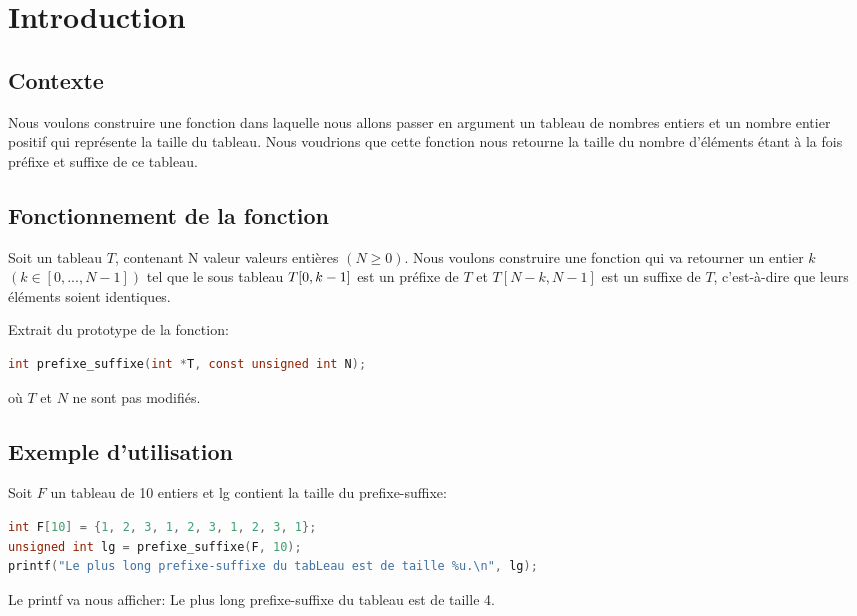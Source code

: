 \section{Introduction}\label{introduction}
\subsection{Contexte}
Nous voulons construire une fonction dans laquelle nous allons passer en argument
un tableau de nombres entiers et un nombre entier positif qui représente la taille du tableau.
Nous voudrions que cette fonction nous retourne la taille du nombre d'éléments
étant à la fois préfixe et suffixe de ce tableau.

\subsection{Fonctionnement de la fonction}
Soit un tableau $T$, contenant N valeur valeurs entières $(N \geq 0)$. Nous 
voulons construire une fonction qui va retourner un entier $k$ $(k \in [0, ...,
 N-1])$ tel que le sous tableau $T[0,\space k-1]$ est un préfixe de $T$ et 
$T[N-k, N-1]$ est un suffixe de $T$, c'est-à-dire que leurs éléments soient
identiques.

Extrait du prototype de la fonction:
\begin{lstlisting}[language=C, caption=Fonction souhaitée]
int prefixe_suffixe(int *T, const unsigned int N);
\end{lstlisting}
où $T$ et $N$ ne sont pas modifiés.

\subsection{Exemple d'utilisation}
Soit $F$ un tableau de 10 entiers et lg contient la taille du prefixe-suffixe:
\begin{lstlisting}[language=C, caption=Exemple d'utilisation]
int F[10] = {1, 2, 3, 1, 2, 3, 1, 2, 3, 1};
unsigned int lg = prefixe_suffixe(F, 10);
printf("Le plus long prefixe-suffixe du tabLeau est de taille %u.\n", lg);
\end{lstlisting}

Le printf va nous afficher: Le plus long prefixe-suffixe du tableau est de
taille 4.
